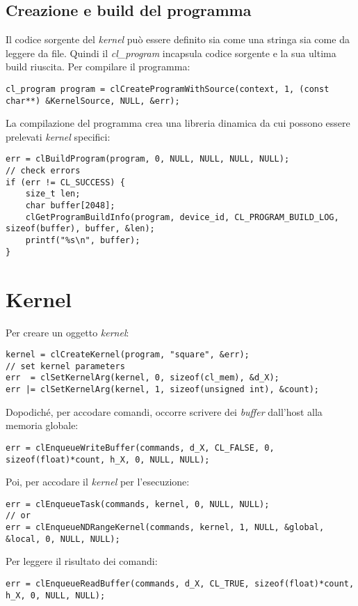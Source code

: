 \subsection{Creazione e build del programma}
Il codice sorgente del \textit{kernel} può essere definito sia come una stringa sia come da leggere da file. Quindi il \textit{cl\_program} incapsula codice sorgente e la sua ultima build riuscita. Per compilare il programma:
\begin{lstlisting}
cl_program program = clCreateProgramWithSource(context, 1, (const char**) &KernelSource, NULL, &err);
\end{lstlisting}
La compilazione del programma crea una libreria dinamica da cui possono essere prelevati \textit{kernel} specifici:
\begin{lstlisting}
err = clBuildProgram(program, 0, NULL, NULL, NULL, NULL);
// check errors
if (err != CL_SUCCESS) {
	size_t len;
	char buffer[2048];
	clGetProgramBuildInfo(program, device_id, CL_PROGRAM_BUILD_LOG, sizeof(buffer), buffer, &len);
	printf("%s\n", buffer);
}
\end{lstlisting}

\section{Kernel}
Per creare un oggetto \textit{kernel}:
\begin{lstlisting}
kernel = clCreateKernel(program, "square", &err);
// set kernel parameters
err  = clSetKernelArg(kernel, 0, sizeof(cl_mem), &d_X);
err |= clSetKernelArg(kernel, 1, sizeof(unsigned int), &count);
\end{lstlisting}
Dopodiché, per accodare comandi, occorre scrivere dei \textit{buffer} dall'host alla memoria globale:
\begin{lstlisting}
err = clEnqueueWriteBuffer(commands, d_X, CL_FALSE, 0, sizeof(float)*count, h_X, 0, NULL, NULL);
\end{lstlisting}
Poi, per accodare il \textit{kernel} per l'esecuzione:
\begin{lstlisting}
err = clEnqueueTask(commands, kernel, 0, NULL, NULL);
// or
err = clEnqueueNDRangeKernel(commands, kernel, 1, NULL, &global, &local, 0, NULL, NULL);
\end{lstlisting}
Per leggere il risultato dei comandi:
\begin{lstlisting}
err = clEnqueueReadBuffer(commands, d_X, CL_TRUE, sizeof(float)*count, h_X, 0, NULL, NULL);
\end{lstlisting}

